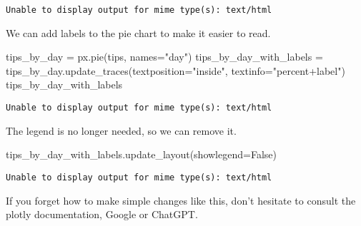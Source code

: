 \documentclass[
  letterpaper,
  DIV=11,
  numbers=noendperiod]{scrreprt}
\newenvironment{Shaded}{\begin{snugshade}}{\end{snugshade}}
\newcommand{\NormalTok}[1]{\textcolor[rgb]{0.00,0.23,0.31}{#1}}
\newcommand{\OperatorTok}[1]{\textcolor[rgb]{0.37,0.37,0.37}{#1}}
\newcommand{\StringTok}[1]{\textcolor[rgb]{0.13,0.47,0.30}{#1}}
\newcommand{\VariableTok}[1]{\textcolor[rgb]{0.07,0.07,0.07}{#1}}
\begin{document}
\begin{verbatim}
Unable to display output for mime type(s): text/html
\end{verbatim}

We can add labels to the pie chart to make it easier to read.

\begin{Shaded}
\begin{Highlighting}[]
\NormalTok{tips\_by\_day }\OperatorTok{=}\NormalTok{ px.pie(tips, names}\OperatorTok{=}\StringTok{"day"}\NormalTok{)}
\NormalTok{tips\_by\_day\_with\_labels }\OperatorTok{=}\NormalTok{ tips\_by\_day.update\_traces(textposition}\OperatorTok{=}\StringTok{"inside"}\NormalTok{, textinfo}\OperatorTok{=}\StringTok{"percent+label"}\NormalTok{)}
\NormalTok{tips\_by\_day\_with\_labels}
\end{Highlighting}
\end{Shaded}

\begin{verbatim}
Unable to display output for mime type(s): text/html
\end{verbatim}

The legend is no longer needed, so we can remove it.

\begin{Shaded}
\begin{Highlighting}[]
\NormalTok{tips\_by\_day\_with\_labels.update\_layout(showlegend}\OperatorTok{=}\VariableTok{False}\NormalTok{)}
\end{Highlighting}
\end{Shaded}

\begin{verbatim}
Unable to display output for mime type(s): text/html
\end{verbatim}

\begin{tcolorbox}[enhanced jigsaw, colframe=quarto-callout-note-color-frame, opacityback=0, titlerule=0mm, bottomrule=.15mm, breakable, leftrule=.75mm, colbacktitle=quarto-callout-note-color!10!white, title=\textcolor{quarto-callout-note-color}{\faInfo}\hspace{0.5em}{Pro}, rightrule=.15mm, coltitle=black, opacitybacktitle=0.6, colback=white, left=2mm, arc=.35mm, toptitle=1mm, bottomtitle=1mm, toprule=.15mm]

If you forget how to make simple changes like this, don't hesitate to
consult the plotly documentation, Google or ChatGPT.

\end{tcolorbox}
\end{document}
